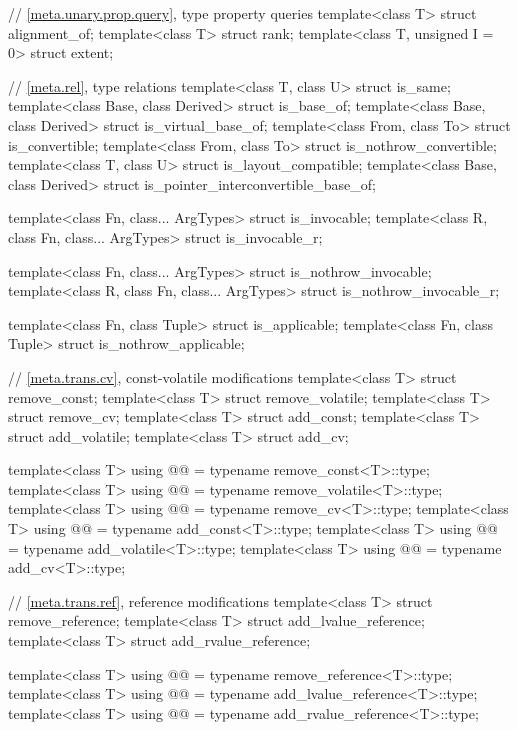 \begin{codeblock}
{  // \ref{meta.unary.prop.query}, type property queries
  template<class T> struct alignment_of;
  template<class T> struct rank;
  template<class T, unsigned I = 0> struct extent;

  // \ref{meta.rel}, type relations
  template<class T, class U> struct is_same;
  template<class Base, class Derived> struct is_base_of;
  template<class Base, class Derived> struct is_virtual_base_of;
  template<class From, class To> struct is_convertible;
  template<class From, class To> struct is_nothrow_convertible;
  template<class T, class U> struct is_layout_compatible;
  template<class Base, class Derived> struct is_pointer_interconvertible_base_of;

  template<class Fn, class... ArgTypes> struct is_invocable;
  template<class R, class Fn, class... ArgTypes> struct is_invocable_r;

  template<class Fn, class... ArgTypes> struct is_nothrow_invocable;
  template<class R, class Fn, class... ArgTypes> struct is_nothrow_invocable_r;

  template<class Fn, class Tuple> struct is_applicable;
  template<class Fn, class Tuple> struct is_nothrow_applicable;

  // \ref{meta.trans.cv}, const-volatile modifications
  template<class T> struct remove_const;
  template<class T> struct remove_volatile;
  template<class T> struct remove_cv;
  template<class T> struct add_const;
  template<class T> struct add_volatile;
  template<class T> struct add_cv;

  template<class T>
    using @@    = typename remove_const<T>::type;
  template<class T>
    using @@ = typename remove_volatile<T>::type;
  template<class T>
    using @@       = typename remove_cv<T>::type;
  template<class T>
    using @@       = typename add_const<T>::type;
  template<class T>
    using @@    = typename add_volatile<T>::type;
  template<class T>
    using @@          = typename add_cv<T>::type;

  // \ref{meta.trans.ref}, reference modifications
  template<class T> struct remove_reference;
  template<class T> struct add_lvalue_reference;
  template<class T> struct add_rvalue_reference;

  template<class T>
    using @@     = typename remove_reference<T>::type;
  template<class T>
    using @@ = typename add_lvalue_reference<T>::type;
  template<class T>
    using @@ = typename add_rvalue_reference<T>::type;

}
\end{codeblock}
